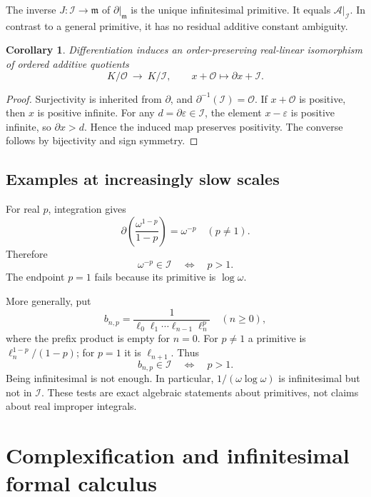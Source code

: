\documentclass[11pt]{article}
\numberwithin{equation}{section}
\newtheorem{corollary}[theorem]{Corollary}
\theoremstyle{definition}
\newcommand{\OO}{\mathcal O}
\newcommand{\mm}{\mathfrak m}
\newcommand{\II}{\mathcal I}
\newcommand{\DD}{\partial}
\newcommand{\Prim}{\mathcal A}
\begin{document}
The inverse $J:\II\to\mm$ of $\DD|_\mm$ is the unique infinitesimal
primitive. It equals $\Prim|_\II$. In contrast to a general primitive, it
has no residual additive constant ambiguity.

\begin{corollary}\label{cor:quotients}
Differentiation induces an order-preserving real-linear isomorphism of
ordered additive quotients
\[
 K/\OO\ \longrightarrow\ K/\II,\qquad x+\OO\longmapsto\DD x+\II.
\]
\end{corollary}
\begin{proof}
Surjectivity is inherited from $\DD$, and
$\DD^{-1}(\II)=\OO$. If $x+\OO$ is positive, then $x$ is positive
infinite. For any $d=\DD\varepsilon\in\II$, the element
$x-\varepsilon$ is positive infinite, so $\DD x>d$. Hence the induced
map preserves positivity. The converse follows by bijectivity and sign
symmetry.
\end{proof}

\subsection{Examples at increasingly slow scales}
For real $p$, integration gives
\[
 \DD\!\left(\frac{\omega^{1-p}}{1-p}\right)=\omega^{-p}
 \quad(p\ne1).
\]
Therefore
\begin{equation}\label{eq:powerthreshold}
 \omega^{-p}\in\II\quad\Longleftrightarrow\quad p>1.
\end{equation}
The endpoint $p=1$ fails because its primitive is $\log\omega$.

More generally, put
\[
 b_{n,p}=\frac{1}{\ell_0\ell_1\cdots\ell_{n-1}\ell_n^p}
 \quad(n\ge0),
\]
where the prefix product is empty for $n=0$. For $p\ne1$ a primitive is
$\ell_n^{1-p}/(1-p)$; for $p=1$ it is $\ell_{n+1}$. Thus
\begin{equation}\label{eq:logthreshold}
 b_{n,p}\in\II\quad\Longleftrightarrow\quad p>1.
\end{equation}
Being infinitesimal is not enough. In particular,
$1/(\omega\log\omega)$ is infinitesimal but not in $\II$.
These tests are exact algebraic statements about primitives, not claims
about real improper integrals.

\section{Complexification and infinitesimal formal calculus}
\label{sec:complexification}
\end{document}
